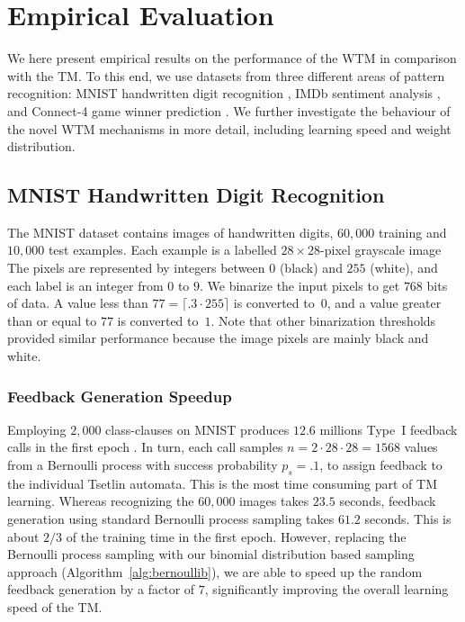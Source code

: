 \documentclass[letterpaper]{article}
\begin{document}
\section{Empirical Evaluation} \label{sec:results}
We here present empirical results on the performance of the WTM in comparison with the TM. To this end, we use datasets from three different areas of pattern recognition: MNIST handwritten digit recognition \cite{lecun1998gradient}, IMDb sentiment analysis \cite{maas-EtAl:2011:ACL-HLT2011}, and Connect-4 game winner prediction \cite{Dua:2019}. We further investigate the behaviour of the novel WTM mechanisms in more detail, including learning speed and weight distribution.

\subsection{MNIST Handwritten Digit Recognition}
The MNIST dataset contains images of handwritten digits, $60{,}000$ training and $10{,}000$ test examples. Each example is a labelled $28\times28$-pixel grayscale image The pixels are represented by integers between $0$ (black) and $255$ (white), and each label is an integer from $0$ to $9$. We binarize the input pixels to get $768$ bits of data. A value less than $77=\lceil.3\cdot255\rceil$ is converted to~$0$, and a value greater than or equal to $77$ is converted to~$1$. Note that other binarization thresholds provided similar performance because the image pixels are mainly black and white.

\subsubsection{Feedback Generation Speedup}
Employing $2{,}000$ class-clauses on MNIST produces $12.6$ millions Type~I feedback calls in the first epoch
.
In turn, each call samples $n=2\cdot28\cdot28=1568$ values from a Bernoulli process with success probability $p_s=.1$, to assign feedback to the individual Tsetlin automata. This is the most time consuming part of TM learning. Whereas recognizing the $60{,}000$ images takes $23.5$ seconds, feedback generation using standard Bernoulli process sampling takes $61.2$ seconds. This is about $2/3$ of the training time in the first epoch. However, replacing the Bernoulli process sampling with our binomial distribution based sampling approach (Algorithm~\ref{alg:bernoullib}), we are able to speed up the random feedback generation by a factor of $7$, significantly improving the overall learning speed of the TM.
 
\end{document}
